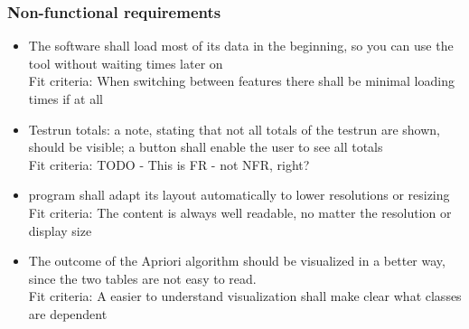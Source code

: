 \subsubsection{Non-functional requirements}
\begin{itemize}
\item The software shall load most of its data in the beginning, so you can use the tool without waiting times later on\\
Fit criteria: When switching between features there shall be minimal loading times if at all

\item Testrun totals: a note, stating that not all totals of the testrun are shown, should be visible; a button shall enable the user to see all totals\\
Fit criteria: TODO - This is FR - not NFR, right?

\item program shall adapt its layout automatically to lower resolutions or resizing\\
Fit criteria: The content is always well readable, no matter the resolution or display size
\item The outcome of the Apriori algorithm should be visualized in a better way, since the two tables are not easy to read.\\
Fit criteria: A easier to understand visualization shall make clear what classes are dependent
\end{itemize}